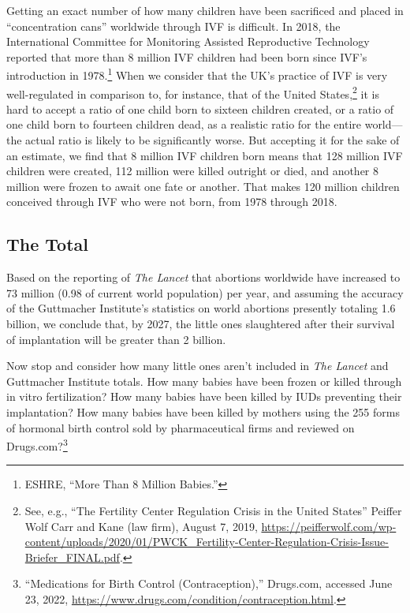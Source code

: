 \documentclass[
]{book}
\begin{document}
Getting an exact number of how many children have been sacrificed and placed in ``concentration cans'' worldwide through IVF is difficult. In 2018, the International Committee for Monitoring Assisted Reproductive Technology reported that more than 8 million IVF children had been born since IVF's introduction in 1978.\footnote{ESHRE, ``More Than 8 Million Babies.''} When we consider that the UK's practice of IVF is very well-regulated in comparison to, for instance, that of the United States,\footnote{See, e.g., ``The Fertility Center Regulation Crisis in the United States'' Peiffer Wolf Carr and Kane (law firm), August 7, 2019, \url{https://peifferwolf.com/wp-content/uploads/2020/01/PWCK_Fertility-Center-Regulation-Crisis-Issue-Briefer_FINAL.pdf}.} it is hard to accept a ratio of one child born to sixteen children created, or a ratio of one child born to fourteen children dead, as a realistic ratio for the entire world---the actual ratio is likely to be significantly worse. But accepting it for the sake of an estimate, we find that 8 million IVF children born means that 128 million IVF children were created, 112 million were killed outright or died, and another 8 million were frozen to await one fate or another. That makes 120 million children conceived through IVF who were not born, from 1978 through 2018.

\hypertarget{the-total}{%
\subsection{The Total}\label{the-total}}

Based on the reporting of \emph{The Lancet} that abortions worldwide have increased to 73 million (0.98 of current world population) per year, and assuming the accuracy of the Guttmacher Institute's statistics on world abortions presently totaling 1.6 billion, we conclude that, by 2027, the little ones slaughtered after their survival of implantation will be greater than 2 billion.

Now stop and consider how many little ones aren't included in \emph{The Lancet} and Guttmacher Institute totals. How many babies have been frozen or killed through in vitro fertilization? How many babies have been killed by IUDs preventing their implantation? How many babies have been killed by mothers using the 255 forms of hormonal birth control sold by pharmaceutical firms and reviewed on Drugs.com?\footnote{``Medications for Birth Control (Contraception),'' Drugs.com, accessed June 23, 2022, \url{https://www.drugs.com/condition/contraception.html}.}
\end{document}
